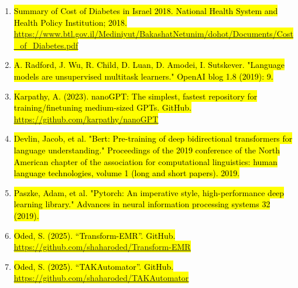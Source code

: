 \documentclass[
]{article}
\begin{document}
\begin{enumerate}
\def\labelenumi{\arabic{enumi}.}
\setcounter{enumi}{26}
\item
  \hl{Summary of Cost of Diabetes in Israel 2018. National Health System
  and Health Policy Institution; 2018.
  \mbox{\href{https://www.btl.gov.il/Mediniyut/BakashatNetunim/dohot/Documents/Cost_of_Diabetes.pdf}{\ul{https://www.btl.gov.il/Mediniyut/BakashatNetunim/dohot/Documents/Cost\_of\_Diabetes.pdf}}}}
\item
  \hl{A. Radford, J. Wu, R. Child, D. Luan, D. Amodei, I. Sutskever.
  "Language models are unsupervised multitask learners." OpenAI blog 1.8
  (2019): 9.‏}
\item
  \hl{Karpathy, A. (2023). nanoGPT: The simplest, fastest repository for
  training/finetuning medium-sized GPTs. GitHub.
  \mbox{\href{https://github.com/karpathy/nanoGPT}{\ul{https://github.com/karpathy/nanoGPT}}}}
\item
  \hl{Devlin, Jacob, et al. "Bert: Pre-training of deep bidirectional
  transformers for language understanding." Proceedings of the 2019
  conference of the North American chapter of the association for
  computational linguistics: human language technologies, volume 1 (long
  and short papers). 2019.‏}
\item
  \hl{Paszke, Adam, et al. "Pytorch: An imperative style,
  high-performance deep learning library." Advances in neural
  information processing systems 32 (2019).‏}
\item
  \hl{Oded, S. (2025). ``Transform-EMR''. GitHub.
  \mbox{\href{https://github.com/shaharoded/Transform-EMR}{\ul{https://github.com/shaharoded/Transform-EMR}}}}
\item
  \hl{Oded, S. (2025). ``TAKAutomator''. GitHub.
  \mbox{\href{https://github.com/shaharoded/TAKAutomator}{\ul{https://github.com/shaharoded/TAKAutomator}}}}
\end{enumerate}
\end{document}
